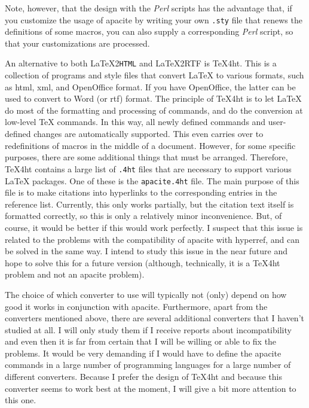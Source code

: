 \documentclass{article}
\newcommand{\latextohtml}{\textup{\LaTeX2\texttt{HTML}}}%
\newcommand{\LaTeXrtf}{\textup{\LaTeX2RTF}}%
\newcommand{\TeXht}{\textup{\TeX4ht}}%
\newcommand{\Perl}{\textsl{Perl}}%
\newcommand{\pkg}[1]{\textsf{#1}}%
\newcommand{\fname}[1]{\texttt{#1}}%
\begin{document}
Note, however, that the design with the \Perl{} scripts has the advantage
that, if you customize the usage of \pkg{apacite} by writing your own
\fname{.sty} file that renews the definitions of some macros, you can also
supply a corresponding \Perl{} script, so that your customizations are
processed.

An alternative to both \latextohtml{} and \LaTeXrtf{} is \TeXht{}. This is
a collection of programs and style files that convert \LaTeX{} to
various formats, such as html, xml, and OpenOffice format. If you have
OpenOffice, the latter can be used to convert to Word (or rtf) format.
The principle of \TeXht{} is to let \LaTeX{} do most of the formatting and
processing of commands, and do the conversion at low-level \TeX{} commands.
In this way, all newly defined commands and user-defined changes are
automatically supported. This even carries over to redefinitions of macros
in the middle of a document. However, for some specific purposes, there are
some additional things that must be arranged. Therefore, \TeXht{} contains a
large list of \fname{.4ht} files that are necessary to support various
\LaTeX{} packages. One of these is the \fname{apacite.4ht} file. The main
purpose of this file is to make citations into hyperlinks to the corresponding
entries in the reference list. Currently, this only works partially, but
the citation text itself is formatted correctly, so this is only a
relatively minor inconvenience. But, of course, it would be better if this
would work perfectly. I suspect that this issue is related to the problems
with the compatibility of \pkg{apacite} with \pkg{hyperref}, and can be
solved in the same way. I intend to study this issue in the near future and
hope to solve this for a future version (although, technically, it is a
\TeXht{} problem and not an \pkg{apacite} problem).

The choice of which converter to use will typically not (only) depend on how
good it works in conjunction with \pkg{apacite}. Furthermore, apart from the
converters mentioned above, there are several additional converters that I
haven't studied at all. I will only study them if I receive reports about
incompatibility and even then it is far from certain that I will be willing or
able to fix the problems. It would be very demanding if I would have to define
the \pkg{apacite} commands in a large number of programming languages for a
large number of different converters. Because I prefer the design of \TeXht{}
and because this converter seems to work best at the moment, I will give a
bit more attention to this one.
\end{document}
